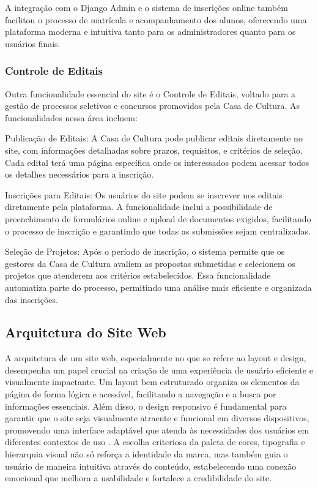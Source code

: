 A integração com o Django Admin e o sistema de inscrições online também facilitou o processo de matrícula e acompanhamento dos alunos, oferecendo uma plataforma moderna e intuitiva tanto para os administradores quanto para os usuários finais.

\subsubsection{Controle de Editais}

Outra funcionalidade essencial do site é o Controle de Editais, voltado para a gestão de processos seletivos e concursos promovidos pela Casa de Cultura. As funcionalidades nessa área incluem:

Publicação de Editais: A Casa de Cultura pode publicar editais diretamente no site, com informações detalhadas sobre prazos, requisitos, e critérios de seleção. Cada edital terá uma página específica onde os interessados podem acessar todos os detalhes necessários para a inscrição.

Inscrições para Editais: Os usuários do site podem se inscrever nos editais diretamente pela plataforma. A funcionalidade inclui a possibilidade de preenchimento de formulários online e upload de documentos exigidos, facilitando o processo de inscrição e garantindo que todas as submissões sejam centralizadas.

Seleção de Projetos: Após o período de inscrição, o sistema permite que os gestores da Casa de Cultura avaliem as propostas submetidas e selecionem os projetos que atenderem aos critérios estabelecidos. Essa funcionalidade automatiza parte do processo, permitindo uma análise mais eficiente e organizada das inscrições.


\subsection{Arquitetura do Site Web}

A arquitetura de um site web, especialmente no que se refere ao layout e design, desempenha um papel crucial na criação de uma experiência de usuário eficiente e visualmente impactante. Um layout bem estruturado organiza os elementos da página de forma lógica e acessível, facilitando a navegação e a busca por informações essenciais. Além disso, o design responsivo é fundamental para garantir que o site seja visualmente atraente e funcional em diversos dispositivos, promovendo uma interface adaptável que atenda às necessidades dos usuários em diferentes contextos de uso \cite{garrett2010elements}. A escolha criteriosa da paleta de cores, tipografia e hierarquia visual não só reforça a identidade da marca, mas também guia o usuário de maneira intuitiva através do conteúdo, estabelecendo uma conexão emocional que melhora a usabilidade e fortalece a credibilidade do site.

